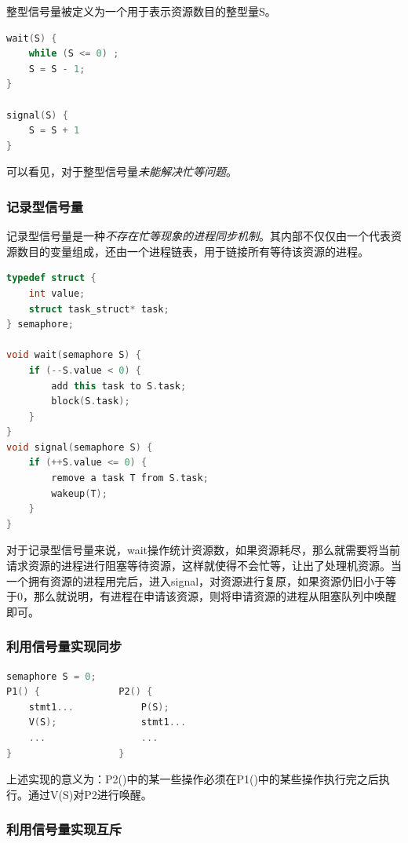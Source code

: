     整型信号量被定义为一个用于表示资源数目的整型量S。

\begin{lstlisting}[language=C++]
wait(S) {
    while (S <= 0) ;
    S = S - 1;
}

signal(S) {
    S = S + 1
}
\end{lstlisting}

    可以看见，对于整型信号量\emph{\color{red}未能解决忙等问题}。

\subsubsection{记录型信号量}

    记录型信号量是一种\emph{\color{red}不存在忙等现象的进程同步机制}。其内部不仅仅由一个代表资源数目的变量组成，还由一个进程链表，用于链接所有等待该资源的进程。

\begin{lstlisting}[language=C++]
typedef struct {
    int value;
    struct task_struct* task;
} semaphore;

void wait(semaphore S) {
    if (--S.value < 0) {
        add this task to S.task;
        block(S.task);
    }
}
void signal(semaphore S) {
    if (++S.value <= 0) {
        remove a task T from S.task;
        wakeup(T);
    }
}
\end{lstlisting}

    对于记录型信号量来说，wait操作统计资源数，如果资源耗尽，那么就需要将当前请求资源的进程进行阻塞等待资源，这样就使得不会忙等，让出了处理机资源。当一个拥有资源的进程用完后，进入signal，对资源进行复原，如果资源仍旧小于等于0，那么就说明，有进程在申请该资源，则将申请资源的进程从阻塞队列中唤醒即可。

\subsubsection{利用信号量实现同步}

\begin{lstlisting}[language=C++]
semaphore S = 0;
P1() {              P2() {
    stmt1...            P(S);
    V(S);               stmt1...
    ...                 ...
}                   }
\end{lstlisting}

    上述实现的意义为：P2()中的某一些操作必须在P1()中的某些操作执行完之后执行。通过V(S)对P2进行唤醒。

\subsubsection{利用信号量实现互斥}

